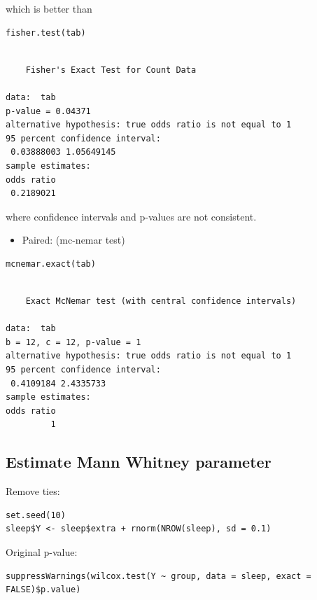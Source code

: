 \documentclass{article}
\begin{document}
which is better than
\lstset{language=r,label= ,caption= ,captionpos=b,numbers=none}
\begin{lstlisting}
fisher.test(tab)
\end{lstlisting}

\begin{verbatim}

	Fisher's Exact Test for Count Data

data:  tab
p-value = 0.04371
alternative hypothesis: true odds ratio is not equal to 1
95 percent confidence interval:
 0.03888003 1.05649145
sample estimates:
odds ratio 
 0.2189021
\end{verbatim}
where confidence intervals and p-values are not consistent.

\bigskip

\begin{itemize}
\item Paired: (mc-nemar test)
\end{itemize}
\lstset{language=r,label= ,caption= ,captionpos=b,numbers=none}
\begin{lstlisting}
mcnemar.exact(tab) 
\end{lstlisting}

\begin{verbatim}

	Exact McNemar test (with central confidence intervals)

data:  tab
b = 12, c = 12, p-value = 1
alternative hypothesis: true odds ratio is not equal to 1
95 percent confidence interval:
 0.4109184 2.4335733
sample estimates:
odds ratio 
         1
\end{verbatim}

\subsection{Estimate Mann Whitney parameter}
\label{sec:orge50702b}

Remove ties:
\lstset{language=r,label= ,caption= ,captionpos=b,numbers=none}
\begin{lstlisting}
set.seed(10)
sleep$Y <- sleep$extra + rnorm(NROW(sleep), sd = 0.1)
\end{lstlisting}

Original p-value:
\lstset{language=r,label= ,caption= ,captionpos=b,numbers=none}
\begin{lstlisting}
suppressWarnings(wilcox.test(Y ~ group, data = sleep, exact = FALSE)$p.value)
\end{lstlisting}
\end{document}
